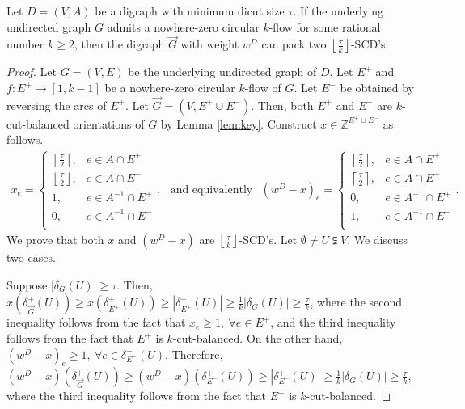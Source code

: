 \documentclass[runningheads]{llncs}
\newcommand{\rounddown}[1]{\left\lfloor#1\right\rfloor}
\newcommand{\roundup}[1]{\left\lceil#1\right\rceil}
\newcommand{\Z}{\mathbb{Z}}
\begin{document}
\begin{theorem}\label{thm:decompose_SCD_weightD}
     Let $D=(V,A)$ be a digraph with minimum dicut size $\tau$. If the underlying undirected graph $G$ admits a nowhere-zero circular $k$-flow for some rational number $k\geq 2$, then the digraph $\vec{G}$ with weight $w^D$ can pack two $\rounddown{\frac{\tau}{k}}$-SCD's.
\end{theorem}
\begin{proof}
    Let $G=(V,E)$ be the underlying undirected graph of $D$. Let $E^+$ and $f:E^+\rightarrow [1,k-1]$ be a nowhere-zero circular $k$-flow of $G$. Let $E^-$ be obtained by reversing the arcs of $E^+$. Let $\vec{G}=(V,E^+\cup E^-)$. Then, both $E^+$ and $E^-$ are $k$-cut-balanced orientations of $G$ by Lemma \ref{lem:key}. 
    Construct $x\in \Z^{E^+\cup E^-}$ as follows.
        \begin{equation*}
            \begin{aligned}
                x_e=\begin{cases}
                    \roundup{\frac{\tau}{2}}, & e\in A\cap E^+\\
                    \rounddown{\frac{\tau}{2}}, & e\in A\cap E^-\\
                    1, & e\in A^{-1}\cap E^+\\
                    0, & e\in A^{-1}\cap E^-\\
                \end{cases},
            \end{aligned}
            \text{ and equivalently }
            \begin{aligned}
                (w^D-x)_e=\begin{cases}
                    \rounddown{\frac{\tau}{2}}, & e\in A\cap E^+\\
                    \roundup{\frac{\tau}{2}}, & e\in A\cap E^-\\
                    0, & e\in A^{-1}\cap E^+\\
                    1, & e\in A^{-1}\cap E^-\\
                \end{cases}.
            \end{aligned}
        \end{equation*}
    We prove that both $x$ and $(w^D-x)$ are $\rounddown{\frac{\tau}{k}}$-SCD's. Let $\emptyset \neq U \subsetneqq V$. We discuss two cases.
    
    Suppose $|\delta_G(U)|\geq \tau$. Then, $x(\delta_{\vec{G}}^+(U))\geq x(\delta_{E^+}^+(U)) \geq |\delta_{E^+}^+(U)|\geq \frac{1}{k}|\delta_{G}(U)|\geq \frac{\tau}{k}$, where the second inequality follows from the fact that $x_e\geq 1,~\forall e\in E^+$, and the third inequality follows from the fact that $E^+$ is $k$-cut-balanced.
    On the other hand, $(w^D-x)_e\geq 1,~\forall e\in\delta_{E^-}^+(U)$. Therefore, $(w^D-x)(\delta_{\vec{G}}^+(U))\geq (w^D-x)(\delta_{E^-}^+(U))\geq  |\delta_{E^-}^+(U)|\geq \frac{1}{k}|\delta_{G}(U)|\geq \frac{\tau}{k}$, where the third inequality follows from the fact that $E^-$ is $k$-cut-balanced. 
        

\end{proof}
\end{document}
